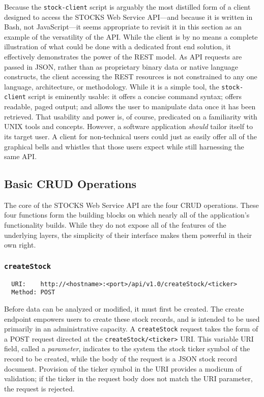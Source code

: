 \documentclass[
11pt,
titlepage,
]{article}
\begin{document}
Because the \texttt{stock-client} script is arguably the most distilled form of
a client designed to access the STOCKS Web Service API---and because it is
written in Bash, not JavaScript---it seems appropriate to revisit it in this
section as an example of the versatility of the API. While the client is by no
means a complete illustration of what could be done with a dedicated front end
solution, it effectively demonstrates the power of the REST model. As API
requests are passed in JSON, rather than as proprietary binary data or native
language constructs, the client accessing the REST resources is not constrained
to any one language, architecture, or methodology. While it is a simple tool,
the \texttt{stock-client} script is eminently usable: it offers a concise
command syntax; offers readable, paged output; and allows the user to manipulate
data once it has been retrieved. That usability and power is, of course,
predicated on a familiarity with UNIX tools and concepts. However, a software
application \textit{should} tailor itself to its target user. A client for
non-technical users could just as easily offer all of the graphical bells and
whistles that those users expect while still harnessing the same API.

\subsection{Basic CRUD Operations}

The core of the STOCKS Web Service API are the four CRUD operations. These four
functions form the building blocks on which nearly all of the application's
functionality builds. While they do not expose all of the features of the
underlying layers, the simplicity of their interface makes them powerful in
their own right.

\subsubsection{\texttt{createStock}}

\begin{lstlisting}
  URI:    http://<hostname>:<port>/api/v1.0/createStock/<ticker>
  Method: POST
\end{lstlisting}

Before data can be analyzed or modified, it must first be created. The create
endpoint empowers users to create these stock records, and is intended to be
used primarily in an administrative capacity. A \texttt{createStock} request
takes the form of a POST request directed at the \texttt{createStock/<ticker>}
URI. This variable URI field, called a \textit{parameter}, indicates to the
system the stock ticker symbol of the record to be created, while the body of
the request is a JSON stock record document. Provision of the ticker symbol in
the URI provides a modicum of validation; if the ticker in the request body does
not match the URI parameter, the request is rejected.
\end{document}
